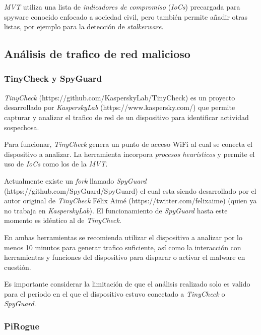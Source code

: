 \documentclass[12pt]{caltech_thesis}
\begin{document}
\textit{MVT} utiliza una lista de \textit{indicadores de compromiso} (\textit{IoCs}) precargada para spyware conocido enfocado a sociedad civil, pero también permite añadir otras listas, por ejemplo para la detección de \textit{stalkerware}.

\subsection{Análisis de trafico de red malicioso}

\subsubsection{TinyCheck y SpyGuard}

\textit{TinyCheck} (https://github.com/KasperskyLab/TinyCheck) es un proyecto desarrollado por \textit{KasperskyLab} (https://www.kaspersky.com/) que permite capturar y analizar el trafico de red de un dispositivo para identificar actividad sospechosa.

Para funcionar, \textit{TinyCheck} genera un punto de acceso WiFi al cual se conecta el dispositivo a analizar. La herramienta incorpora \textit{procesos heurísticos} y permite el uso de \textit{IoCs} como los de la \textit{MVT}.

Actualmente existe un \textit{fork} llamado \textit{SpyGuard} (https://github.com/SpyGuard/SpyGuard) el cual esta siendo desarrollado por el autor original de \textit{TinyCheck} Félix Aimé (https://twitter.com/felixaime) (quien ya no trabaja en \textit{KasperskyLab}). El funcionamiento de \textit{SpyGuard} hasta este momento es idéntico al de \textit{TinyCheck}.

En ambas herramientas se recomienda utilizar el dispositivo a analizar por lo menos 10 minutos para generar trafico suficiente, así como la interacción con herramientas y funciones del dispositivo para disparar o activar el malware en cuestión.

Es importante considerar la limitación de que el análisis realizado solo es valido para el periodo en el que el dispositivo estuvo conectado a \textit{TinyCheck} o \textit{SpyGuard}.

\subsubsection{PiRogue}
\end{document}
